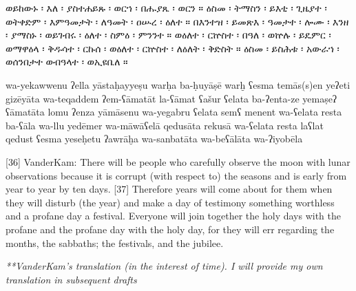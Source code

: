 \begin{ethiopictext}
    ወይከውኑ ፡ እለ ፡ ያስተሐይጹ ፡ ወርኀ ፡ በሑያጼ ፡ ወርን ።
    ዕስመ ፡ ትማስን ፡ ይእቲ ፡ ጊዜያተ ፡ ወትቀድም ፡ እምዓመታት ፡ ለዓመት ፡ ዐሡረ ፡ ዕለተ ።
    በእንተዝ ፡ ይመጽእ ፡ ዓመታተ ፡ ሎሙ ፡ እንዘ ፡ ያማስኑ ፡ ወይገብሩ ፡ ዕለተ ፡ ስምዕ ፡ ምንንተ ።
    ወዕለተ ፡ ርኵስተ ፡ በዓለ ፡ ወኵሉ ፡ ይዴምር ፡ ወማዋዕላ ፡ 
        ቅዱሳተ ፡ ርኩሰ ፡ ወዕለተ ፡ ርኵስተ ፡ ለዕለት ፡ ቅድስት ።
    ዕስመ ፡ ይስሕቱ ፡ አውራኀ ፡ ወሰንበታተ ወብዓላተ ፡ ወኢዩቤለ ።
\end{ethiopictext}
\begin{transliteration}
    wa-yekawwenu ʔella yāstaḥayyeṣu warḥa ba-ḥuyāṣē warḫ
    ʕesma temās(s)en yeʔeti gizēyāta wa-teqaddem ʔem-ʕāmatāt la-ʕāmat ʕašur ʕelata
    ba-ʔenta-ze yemaṣeʔ ʕāmatāta lomu ʔenza yāmāsenu wa-yegabru ʕelata semʕ menent
    wa-ʕelata resta ba-ʕāla wa-llu yedēmer wa-māwāʕelā 
        qedusāta rekusā wa-ʕelata resta laʕlat qedust
    ʕesma yeseḥetu ʔawrāḫa wa-sanbatāta wa-beʕālāta wa-ʔiyobēla
\end{transliteration}
\begin{translation}
    [36] VanderKam: There will be people who carefully observe the moon with lunar observations 
    because it is corrupt (with respect to) the seasons and is early from year to year by ten days. 
    [37] Therefore years will come about for them when they will disturb (the year) 
    and make a day of testimony something worthless and a profane day a festival. 
    Everyone will join together the holy days with the profane and the profane day with the holy day, 
    for they will err regarding the months, the sabbaths; the festivals, and the jubilee.

    
    \emph{**VanderKam's translation (in the interest of time). I will provide my own translation in subsequent drafts}
\end{translation}